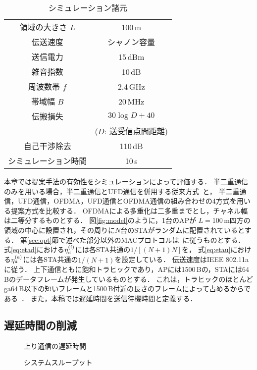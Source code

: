 \documentclass[technicalreport]{ieicej}
\begin{document}
	\begin{table}[t]
		\centering
		\caption{シミュレーション諸元}
		\label{tab:param}
		\begin{tabular}{cc} \hline
			領域の大きさ $L$ & 100\,m \\
			伝送速度 & シャノン容量 \\
			送信電力 & 15\,dBm \\
			雑音指数 & 10\,dB \\
			周波数帯 $f$& 2.4\,GHz \\
			帯域幅 $B$ & 20\,MHz \\
			伝搬損失 & $30\log D + 40$\\
			&($D$: 送受信点間距離)\\
			自己干渉除去 & 110\,dB \\
			シミュレーション時間 & 10\,s \\\hline
		\end{tabular}
	\end{table}

	本章では提案手法の有効性をシミュレーションによって評価する．
	半二重通信のみを用いる場合，半二重通信とUFD通信を併用する従来方式~\cite{promac_fair}と，
	半二重通信，UFD通信，OFDMA，UFD通信とOFDMA通信の組み合わせの4方式を用いる提案方式を比較する．
	OFDMAによる多重化は二多重までとし，チャネル幅は二等分するものとする．
	図\ref{fig:model}のように，1台のAPが $L=$100\,m四方の領域の中心に設置され，その周りに$N$台のSTAがランダムに配置されているとする．
	第\ref{sec:opt}節で述べた部分以外のMACプロトコルは~\cite{promac}に従うものとする．
	式\eqref{eq:etad}における$\eta_{\rm d}^{(i)}$には各STA共通の$1/[(N+1)N]$を，
	式\eqref{eq:etau}における$\eta_{\rm u}^{(a)}$には各STA共通の$1/(N+1)$を設定している．
	伝送速度はIEEE 802.11aに従う．
	上下通信ともに飽和トラヒックであり，APには1500\,Bの，STAには64\,Bのデータフレームが発生しているものとする．
	これは，トラヒックのほとんどga64\,B以下の短いフレームと1500\,B付近の長さのフレームによって占めるからである~\cite{traffic}．
	また，本稿では遅延時間を送信待機時間と定義する．

	\subsection{遅延時間の削減}
		\begin{figure}[t]
			\centering
			\caption{上り通信の遅延時間}
			\label{fig:delay}
		\end{figure}
		\begin{figure}[t]
			\centering
			\caption{システムスループット}
			\label{fig:thr}
		\end{figure}
\end{document}
